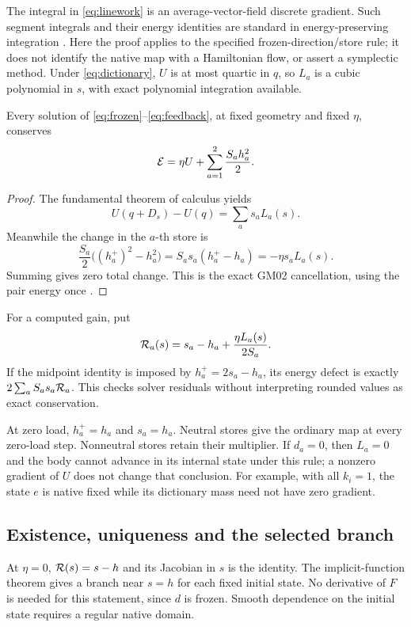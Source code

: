 The integral in \eqref{eq:linework} is an average-vector-field discrete gradient. Such segment integrals and their energy identities are standard in energy-preserving integration \cite{AVF}. Here the proof applies to the specified frozen-direction/store rule; it does not identify the native map with a Hamiltonian flow, or assert a symplectic method. Under \eqref{eq:dictionary}, \(U\) is at most quartic in \(q\), so \(L_a\) is a cubic polynomial in \(s\), with exact polynomial integration available.

\begin{theorem}\label{thm:energy}
Every solution of \eqref{eq:frozen}--\eqref{eq:feedback}, at fixed geometry and fixed \(\eta\), conserves
\begin{equation}
 \mathcal E=\eta U+\sum_{a=1}^2\frac{S_ah_a^2}{2}.
 \label{eq:energy}
\end{equation}
\end{theorem}
\begin{proof}
The fundamental theorem of calculus yields
\[
 U(q+D_s)-U(q)=\sum_a s_aL_a(s).
\]
Meanwhile the change in the \(a\)-th store is
\[
 \frac{S_a}{2}\big((h_a^+)^2-h_a^2\big)
 =S_as_a(h_a^+-h_a)=-\eta s_aL_a(s).
\]
Summing gives zero total change. This is the exact GM02 cancellation, using the pair energy once \cite{GM02}.
\end{proof}
For a computed gain, put
\begin{equation}
 {\cal R}_a(s)=s_a-h_a+\frac{\eta L_a(s)}{2S_a}.
 \label{eq:residual}
\end{equation}
If the midpoint identity is imposed by \(h_a^+=2s_a-h_a\), its energy defect is exactly \(2\sum_a S_as_a{\cal R}_a\). This checks solver residuals without interpreting rounded values as exact conservation.

At zero load, \(h_a^+=h_a\) and \(s_a=h_a\). Neutral stores give the ordinary map at every zero-load step. Nonneutral stores retain their multiplier. If \(d_a=0\), then \(L_a=0\) and the body cannot advance in its internal state under this rule; a nonzero gradient of \(U\) does not change that conclusion. For example, with all \(k_i=1\), the state \(e\) is native fixed while its dictionary mass need not have zero gradient.

\subsection{Existence, uniqueness and the selected branch}
At \(\eta=0\), \({\cal R}(s)=s-h\) and its Jacobian in \(s\) is the identity. The implicit-function theorem gives a branch near \(s=h\) for each fixed initial state. No derivative of \(F\) is needed for this statement, since \(d\) is frozen. Smooth dependence on the initial state requires a regular native domain.


